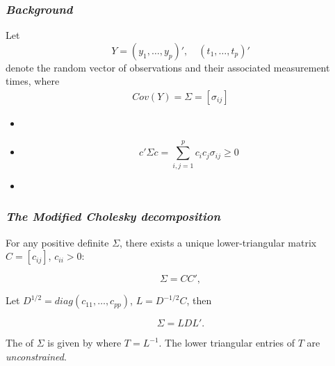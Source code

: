 
{ %
\begin{frame}[c]%
 \titlepage
\end{frame}
}

\begin{frame}
\frametitle{\textit{Background}}
Let 
\[
Y = \left(y_1,\dots, y_p\right)', \quad \left(t_1,\dots, t_p\right)'
\]
denote the random vector of observations and their associated measurement times, where 
\begin{align*}
 Cov\left(Y\right) = \Sigma = \left[ \sigma_{ij} \right] 
\end{align*}

\begin{itemize}
\item {} \pause
\item {}
\begin{equation*}
 		c'\Sigma c = \sum_{i,j = 1}^p c_i c_j \sigma_{ij} \ge 0
\end{equation*} \pause
\item {} 
\end{itemize}
\end{frame}




\begin{frame}
\frametitle{\emph{The Modified Cholesky decomposition}}
For any positive definite $\Sigma$, there exists a unique lower-triangular matrix $C =  \left[c_{ij} \right]$, $c_{ii}> 0$:

\begin{equation*}
\Sigma = CC',
\end{equation*}

Let $D^{1/2} = diag\left( c_{11},\dots, c_{pp} \right)$, $L = D^{-1/2}C$, then 

\begin{equation*}
\Sigma =L D L'. %
\end{equation*}

The  of $\Sigma$ is given by
where {$T = L^{-1}$}. The lower triangular entries of $T$ are \textit{unconstrained}.

\end{frame}





